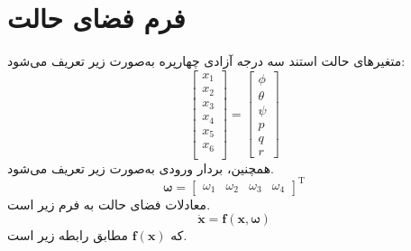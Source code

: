 \section{فرم فضای حالت}\label{spacestate}
متغیرهای حالت استند سه درجه آزادی چهارپره به‌صورت زیر تعریف می‌شود:
\begin{equation}
	\begin{bmatrix}
		x_1\\x_2\\x_3\\x_4\\x_5\\x_6\\
	\end{bmatrix} = 
\begin{bmatrix}
	\phi\\ \theta \\ \psi \\ p\\ q\\ r
\end{bmatrix}
\end{equation}
همچنین، بردار ورودی به‌صورت زیر تعریف می‌شود.
\begin{equation}
	\boldsymbol{\omega} = \begin{bmatrix}
		\omega_1&\omega_2&\omega_3&\omega_4
	\end{bmatrix}^\mathrm{T}
\end{equation}
معادلات فضای حالت به فرم زیر است.
\begin{equation}
	\boldsymbol{\dot x} = \boldsymbol f(\boldsymbol x, \boldsymbol{\omega})
\end{equation}
که $\boldsymbol f(\boldsymbol x)$ مطابق رابطه زیر است.
